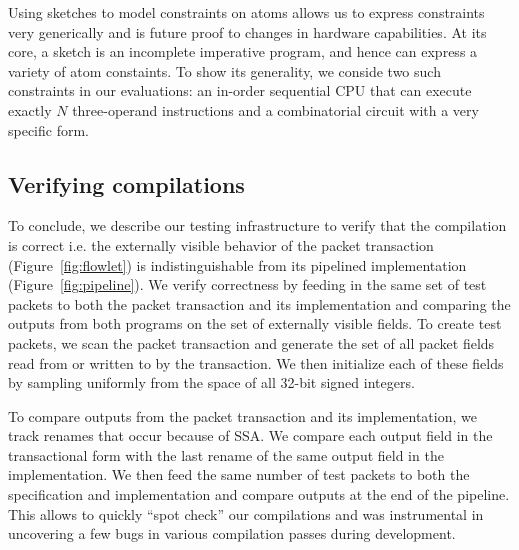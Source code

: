 Using sketches to model constraints on atoms allows us to express constraints
very generically and is future proof to changes in hardware capabilities. At
its core, a sketch is an incomplete imperative program, and hence can express a
variety of atom constaints. To show its generality, we conside two such
constraints in our evaluations: an in-order sequential CPU that can execute
exactly $N$ three-operand instructions and a combinatorial circuit with a very
specific form.

\subsection{Verifying compilations}

To conclude, we describe our testing infrastructure to verify that the
compilation is correct i.e. the externally visible behavior of the packet
transaction (Figure~\ref{fig:flowlet}) is indistinguishable from its pipelined
implementation (Figure~\ref{fig:pipeline}). We verify correctness by feeding in
the same set of test packets to both the packet transaction and its
implementation and comparing the outputs from both programs on the set of
externally visible fields. To create test packets, we scan the packet
transaction and generate the set of all packet fields read from or written to
by the transaction. We then initialize each of these fields by sampling
uniformly from the space of all 32-bit signed integers.

To compare outputs from the packet transaction and its implementation, we track
renames that occur because of SSA. We compare each output field in the
transactional form with the last rename of the same output field in the
implementation. We then feed the same number of test packets to both the
specification and implementation and compare outputs at the end of the
pipeline. This allows to quickly ``spot check'' our compilations and was
instrumental in uncovering a few bugs in various compilation passes during
development.
